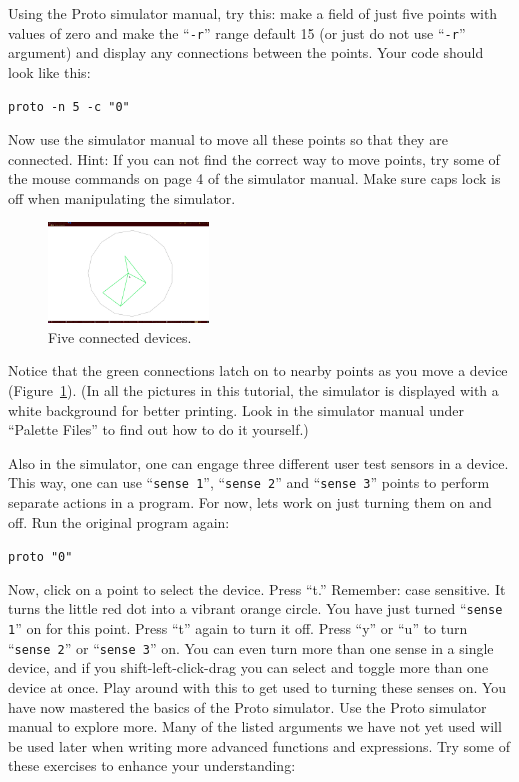 \documentclass{article}
\newcommand\code[1]{\begin{center}\var{#1}\end{center}}
\newcommand\var[1]{{\tt #1}}
\newcommand\qvar[1]{``{\tt #1}''}
\begin{document}
Using the Proto simulator manual, try this: make a field of just five
points with values of zero and make the \qvar{-r} range default 15 (or
just do not use \qvar{-r} argument) and display any connections
between the points.  Your code should look like this:

\code{proto -n 5 -c "0"}

Now use the simulator manual to move all these points so that they are
connected. Hint: If you can not find the correct way to move points,
try some of the mouse commands on page 4 of the simulator manual.
Make sure caps lock is off when manipulating the simulator.

\begin{figure}
  \vspace{-0.8cm}
  \includegraphics[width=0.38\textwidth]{figures/five-points.png}
  \caption{Five connected devices.}
  \vspace{-0.5cm}
  \label{f:fivepoints}
\end{figure}

Notice that the green connections latch on to nearby points as you
move a device (Figure~\ref{f:fivepoints}).  (In all the pictures in
this tutorial, the simulator is displayed with a white background for
better printing.  Look in the simulator manual under ``Palette Files''
to find out how to do it yourself.)

Also in the simulator, one can engage three different user test
sensors in a device. This way, one can use \qvar{sense 1}, \qvar{sense
  2} and \qvar{sense 3} points to perform separate actions in a
program.  For now, lets work on just turning them on and off.  Run the
original program again:

\code{proto "0"}

Now, click on a point to select the device. Press ``t.'' Remember:
case sensitive.  It turns the little red dot into a vibrant orange
circle.  You have just turned \qvar{sense 1} on for this point.  Press
``t'' again to turn it off.  Press ``y'' or ``u'' to turn \qvar{sense
  2} or \qvar{sense 3} on.  You can even turn more than one sense in a
single device, and if you shift-left-click-drag you can select and
toggle more than one device at once.  Play around with this to get used
to turning these senses on.  You have now mastered the basics of the
Proto simulator.  Use the Proto simulator manual to explore more.  Many
of the listed arguments we have not yet used will be used later when
writing more advanced functions and expressions.  Try some of these
exercises to enhance your understanding:
\end{document}

